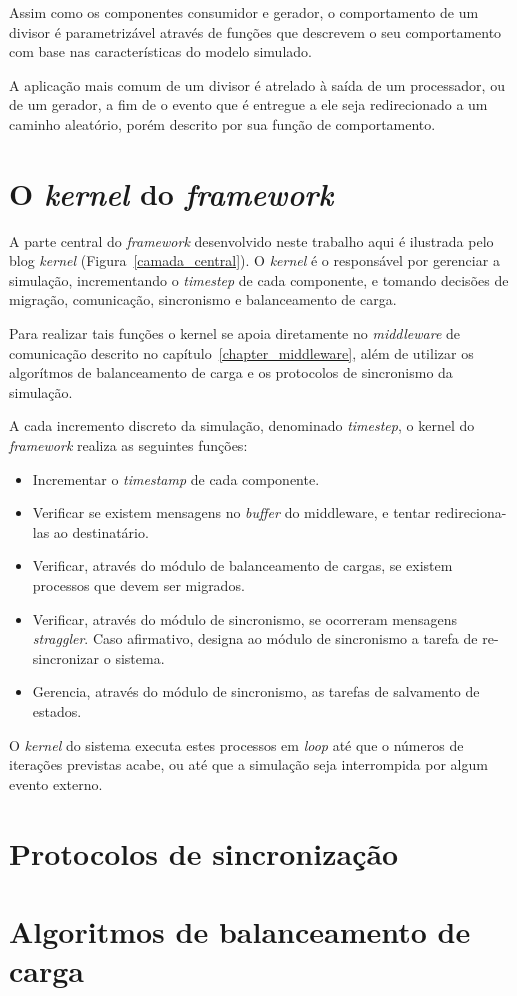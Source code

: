 Assim como os componentes consumidor e gerador, o comportamento de um divisor é parametrizável através de funções que descrevem o seu comportamento com base nas características do modelo simulado.

A aplicação mais comum de um divisor é atrelado à saída de um processador, ou de um gerador, a fim de o evento que é entregue a ele seja redirecionado a um caminho aleatório, porém descrito por sua função de comportamento.

\section{O \textit{kernel} do \textit{framework}}

A parte central do \textit{framework} desenvolvido neste trabalho aqui é ilustrada pelo blog \textit{kernel} (Figura~\ref{camada_central}). O \textit{kernel} é o responsável por gerenciar a simulação, incrementando o \textit{timestep} de cada componente, e tomando decisões de migração, comunicação, sincronismo e balanceamento de carga.

Para realizar tais funções o kernel se apoia diretamente no \textit{middleware} de comunicação descrito no capítulo~\ref{chapter_middleware}, além de utilizar os algorítmos de balanceamento de carga e os protocolos de sincronismo da simulação.

A cada incremento discreto da simulação, denominado \textit{timestep}, o kernel do \textit{framework} realiza as seguintes funções:

\begin{itemize}
\item Incrementar o \textit{timestamp} de cada componente.
\item Verificar se existem mensagens no \textit{buffer} do middleware, e tentar redireciona-las ao destinatário.
\item Verificar, através do módulo de balanceamento de cargas, se existem processos que devem ser migrados.
\item Verificar, através do módulo de sincronismo, se ocorreram mensagens \textit{straggler}. Caso afirmativo, designa ao módulo de sincronismo a tarefa de re-sincronizar o sistema.
\item Gerencia, através do módulo de sincronismo, as tarefas de salvamento de estados.
\end{itemize}

O \textit{kernel} do sistema executa estes processos em \textit{loop} até que o números de iterações previstas acabe, ou até que a simulação seja interrompida por algum evento externo.

\section{Protocolos de sincronização}


\section{Algoritmos de balanceamento de carga}
